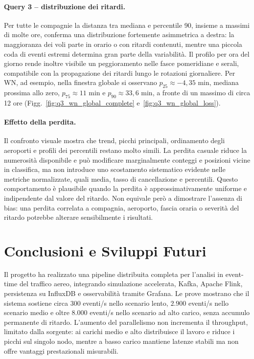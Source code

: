 \documentclass[conference]{IEEEtran}
\begin{document}
\paragraph{Query 3 -- distribuzione dei ritardi.}
Per tutte le compagnie la distanza tra mediana e percentile 90, insieme a massimi di molte ore, conferma una distribuzione fortemente asimmetrica a destra: la maggioranza dei voli parte in orario o con ritardi contenuti, mentre una piccola coda di eventi estremi determina gran parte della variabilità. Il profilo per ora del giorno rende inoltre visibile un peggioramento nelle fasce pomeridiane e serali, compatibile con la propagazione dei ritardi lungo le rotazioni giornaliere. Per WN, ad esempio, nella finestra globale si osservano $p_{25}\approx-4,35$ min, mediana prossima allo zero, $p_{75}\approx11$ min e $p_{90}\approx33,6$ min, a fronte di un massimo di circa 12 ore (Figg.~\ref{fig:q3_wn_global_complete} e~\ref{fig:q3_wn_global_loss}).

\paragraph{Effetto della perdita.}
Il confronto visuale mostra che trend, picchi principali, ordinamento degli aeroporti e profili dei percentili restano molto simili. La perdita casuale riduce la numerosità disponibile e può modificare marginalmente conteggi e posizioni vicine in classifica, ma non introduce uno scostamento sistematico evidente nelle metriche normalizzate, quali media, tasso di cancellazione e percentili. Questo comportamento è plausibile quando la perdita è approssimativamente uniforme e indipendente dal valore del ritardo. Non equivale però a dimostrare l'assenza di bias: una perdita correlata a compagnia, aeroporto, fascia oraria o severità del ritardo potrebbe alterare sensibilmente i risultati.


\section{Conclusioni e Sviluppi Futuri}\label{sec:conclusions_future_work}

Il progetto ha realizzato una pipeline distribuita completa per l'analisi in event-time del traffico aereo, integrando simulazione accelerata, Kafka, Apache Flink, persistenza su InfluxDB e osservabilità tramite Grafana. Le prove mostrano che il sistema sostiene circa $300$ eventi/s nello scenario lento, $2.900$ eventi/s nello scenario medio e oltre $8.000$ eventi/s nello scenario ad alto carico, senza accumulo permanente di ritardo. L'aumento del parallelismo non incrementa il throughput, limitato dalla sorgente: ai carichi medio e alto distribuisce il lavoro e riduce i picchi sul singolo nodo, mentre a basso carico mantiene latenze stabili ma non offre vantaggi prestazionali misurabili.
\end{document}
